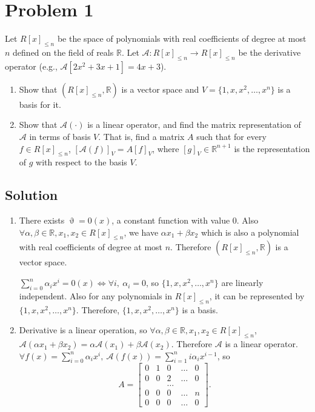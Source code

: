 \documentclass[11pt]{report}
\theoremstyle{definition}
\begin{document}
\section*{Problem 1}
Let $R[x]_{\le n}$ be the space of polynomials with real coefficients of degree at most $n$ defined on the field of reals $\mathbb{R}$.
Let $\mathcal{A}:R[x]_{\le n} \rightarrow R[x]_{\le n}$ be the derivative operator (e.g., $\mathcal{A}[2x^2+3x+1]=4x+3$).

\begin{enumerate}[label = \alph*)]
\item
Show that $(R[x]_{\le n},\mathbb{R})$ is a vector space and $V=\{1,x,x^2,\ldots,x^n\}$ is a basis for it.
\item
Show that $\mathcal{A}(\cdot)$  is a linear operator, and find the matrix representation of $\mathcal{A}$ in terms of basis $V$. That is, find a matrix $A$ such that for every $f\in R[x]_{\le n}$, $[\mathcal{A}(f)]_V=A[f]_V$, where $[g]_V \in \mathbb{R}^{n+1}$ is the representation of $g$ with respect to the basis $V$.
\end{enumerate}

\subsection*{Solution}
\begin{enumerate}[label = \alph*)]
\item
There exists $\upvartheta = 0(x)$, a constant function with value 0. Also $\forall \alpha, \beta \in \mathbb{R}, x_1, x_2 \in R[x]_{\le n}$, we have $\alpha x_1 + \beta x_2$ which is also a polynomial with real coefficients of degree at most $n$. Therefore $(R[x]_{\le n},\mathbb{R})$ is a vector space.

$\sum\limits_{i=0}^{n} \alpha_i x^i = 0(x) \iff \forall i,~\alpha_i = 0$, so $\{1,x,x^2,\ldots,x^n\}$ are linearly independent. Also for any polynomials in $R[x]_{\le n}$, it can be represented by $\{1,x,x^2,\ldots,x^n\}$. Therefore, $\{1,x,x^2,\ldots,x^n\}$ is a basis.

\item
Derivative is a linear operation, so $\forall \alpha, \beta \in \mathbb{R}, x_1, x_2 \in R[x]_{\le n}$, $\mathcal{A}(\alpha x_1 + \beta x_2) = \alpha \mathcal{A}(x_1) + \beta \mathcal{A}(x_2)$. Therefore $\mathcal{A}$ is a linear operator. $\forall f(x) = \sum\limits_{i=0}^{n} \alpha_i x^i,~\mathcal{A}(f(x)) = \sum\limits_{i=1}^{n} i \alpha_i x^{i-1}$, so $$A=\begin{bmatrix}0 &1 &0 &\ldots &0\\0 &0 &2 &\ldots &0\\ &&\ldots& \\0 &0 &0 &\ldots &n\\0 &0 &0 &\ldots &0\end{bmatrix}.$$
\end{enumerate}
\end{document}
